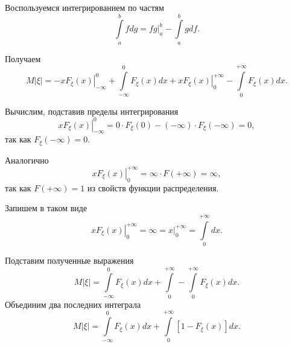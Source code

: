 Воспользуемся интегрированием по частям
$$ \int \limits_a^b fdg =
\left. fg \right|_a^b - \int \limits_a^b gdf.$$

Получаем
$$M \left| \xi \right| =
\left. -xF_{ \xi } \left( x \right) \right|_{- \infty }^0 + \int \limits_{- \infty }^0 F_{ \xi } \left( x \right) dx +
\left. xF_{ \xi } \left( x \right) \right|_0^{+ \infty } - \int \limits_0^{+ \infty } F_{ \xi } \left( x \right) dx.$$

Вычислим, подставив пределы интегрирования
$$ \left. xF_{ \xi } \left( x \right) \right|_{- \infty }^0 =
0 \cdot F_{ \xi } \left( 0 \right) - \left( - \infty \right) \cdot F_{ \xi } \left( - \infty \right) = 0,$$
так как $F_{ \xi } \left( - \infty \right) = 0$.

Аналогично
$$ \left. xF_{ \xi } \left( x \right) \right|_0^{+ \infty } = \infty \cdot F \left( + \infty \right) = \infty,$$
так как $F \left( + \infty \right) = 1$ из свойств функции распределения.

Запишем в таком виде
$$ \left. xF_{ \xi } \left( x \right) \right|_0^{+ \infty } =
\infty =
\left. x \right|_0^{+ \infty } =
\int \limits_0^{+ \infty } dx.$$

Подставим полученные выражения
$$M \left| \xi \right| =
\int \limits_{- \infty }^0 F_{ \xi } \left( x \right) dx + \int \limits_0^{+ \infty } -
\int \limits_0^{+ \infty } F_{ \xi } \left( x \right) dx.$$
Объединим два последних интеграла
$$M \left| \xi \right| =
\int \limits_{- \infty }^0 F_{ \xi } \left( x \right) dx + \int \limits_0^{+ \infty } \left[ 1 - F_{ \xi } \left( x \right) \right] dx.$$
